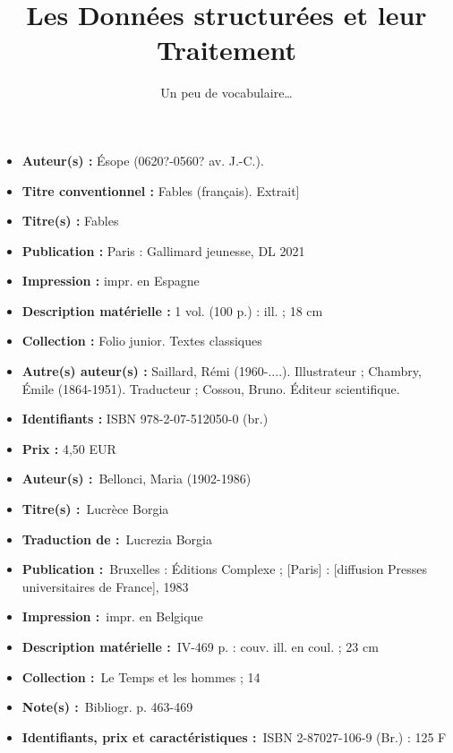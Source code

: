 \documentclass[14pt, aspectratio=43]{beamer}
\title{Les Données structurées et leur Traitement}
\subtitle{Un peu de vocabulaire…}
\begin{document}
\begin{frame}
\begin{itemize}
\item \textbf{Auteur(s) :} Ésope (0620?-0560? av. J.-C.).
\item \textbf{Titre conventionnel :} Fables (français). Extrait]
\item \textbf{Titre(s) :} Fables 
\item \textbf{Publication :} Paris : Gallimard jeunesse, DL 2021
\item \textbf{Impression :} impr. en Espagne
\item \textbf{Description matérielle :} 1 vol. (100 p.) : ill. ; 18 cm
\item \textbf{Collection :} Folio junior. Textes classiques
\item \textbf{Autre(s) auteur(s) :} Saillard, Rémi (1960-....). Illustrateur ; Chambry, Émile (1864-1951). Traducteur ; Cossou, Bruno. Éditeur scientifique.
\item \textbf{Identifiants :} ISBN 978-2-07-512050-0 (br.) 
\item \textbf{Prix :} 4,50 EUR
\end{itemize}
\end{frame}

\begin{frame}
\begin{itemize}
\item \textbf{Auteur(s) :} Bellonci, Maria (1902-1986) 
\item \textbf{Titre(s) :} Lucrèce Borgia
\item \textbf{Traduction de :} Lucrezia Borgia
\item \textbf{Publication :} Bruxelles : Éditions Complexe ; [Paris] : [diffusion Presses universitaires de France], 1983
\item \textbf{Impression :} impr. en Belgique
\item \textbf{Description matérielle :} IV-469 p. : couv. ill. en coul. ; 23 cm
\item \textbf{Collection :} Le Temps et les hommes ; 14
\item \textbf{Note(s) :} Bibliogr. p. 463-469
\item \textbf{Identifiants, prix et caractéristiques :} ISBN 2-87027-106-9 (Br.) : 125 F
\end{itemize}
\end{frame}
\end{document}
